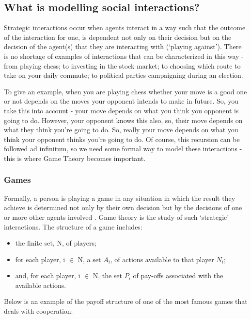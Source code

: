 \documentclass[11pt]{article}
\newcommand*{\np}{\par\noindent\newline}
\begin{document}
\subsection{What is modelling social interactions?}\label{modelling_social_interactions}
Strategic interactions occur when agents interact in a way such that the
outcome of the interaction for one, is dependent not  only on their decision
but on the decision of the agent(s) that they are interacting with
(`playing against'). There is no shortage of examples of interactions that can
be characterized in this way - from playing chess; to investing in the stock
market; to choosing which route to take on your daily commute; to political
parties campaigning during an election.
\np To give an example, when you are playing chess whether your move is a good
one or not depends on the moves your opponent intends to make in future. So,
you take this into account - your move depends on what you think you opponent
is going to do. However, your opponent knows this also, so, their move depends
on what they think you're going to do. So, really your move depends on what you
think your opponent thinks you're going to do. Of course, this recursion can be
followed ad infinitum, so we need some formal way to model these interactions -
this is where Game Theory becomes important.
\subsubsection{Games}
Formally, a person is playing a game in any situation in which the result they
achieve is determined not only by their own decision but by the decisions of
one or more other agents involved \cite{angner_course_2012}. Game theory is the
study of such `strategic' interactions.
The structure of a game includes:
\begin{itemize}
	\item the finite set, N, of players;
	\item for each player, i $\in$ N, a set $A_i$, of actions available to that
	player $N_i$;
	\item and, for each player, i $\in$ N, the set $P_i$ of pay-offs associated
	with the available actions.
\end{itemize}
\cite{osborne_course_1994}
\np Below is an example of the payoff structure of one of the most famous games
that deals with cooperation: 
\end{document}
